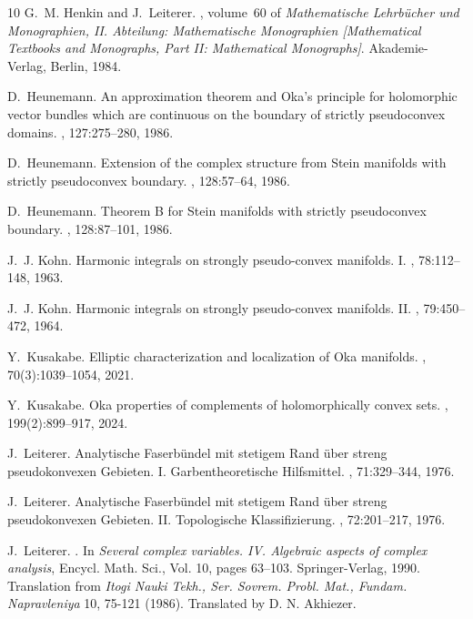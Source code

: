 \documentclass[11pt]{amsart}
\numberwithin{equation}{section}
\theoremstyle{definition}
\begin{document}
\begin{thebibliography}{10}
G.~M. Henkin and J.~Leiterer.
, volume~60 of {\em
  Mathematische Lehrb\"ucher und Monographien, II. Abteilung: Mathematische
  Monographien [Mathematical Textbooks and Monographs, Part II: Mathematical
  Monographs]}.
\newblock Akademie-Verlag, Berlin, 1984.

D.~Heunemann.
\newblock An approximation theorem and {O}ka's principle for holomorphic vector
  bundles which are continuous on the boundary of strictly pseudoconvex
  domains.
, 127:275--280, 1986.

D.~Heunemann.
\newblock Extension of the complex structure from {S}tein manifolds with
  strictly pseudoconvex boundary.
, 128:57--64, 1986.

D.~Heunemann.
\newblock Theorem {B} for {S}tein manifolds with strictly pseudoconvex
  boundary.
, 128:87--101, 1986.

J.~J. Kohn.
\newblock Harmonic integrals on strongly pseudo-convex manifolds. {I}.
, 78:112--148, 1963.

J.~J. Kohn.
\newblock Harmonic integrals on strongly pseudo-convex manifolds. {II}.
, 79:450--472, 1964.

Y.~Kusakabe.
\newblock Elliptic characterization and localization of {O}ka manifolds.
, 70(3):1039--1054, 2021.

Y.~Kusakabe.
\newblock Oka properties of complements of holomorphically convex sets.
, 199(2):899--917, 2024.

J.~Leiterer.
\newblock Analytische {F}aserb\"undel mit stetigem {R}and {\"u}ber streng
  pseudokonvexen {G}ebieten. {I}. {G}arbentheoretische {H}ilfsmittel.
, 71:329--344, 1976.

J.~Leiterer.
\newblock Analytische {F}aserb\"undel mit stetigem {R}and \"uber streng
  pseudokonvexen {G}ebieten. {II}. {T}opologische {K}lassifizierung.
, 72:201--217, 1976.

J.~{Leiterer}.
.
\newblock In {\em Several complex variables. IV. Algebraic aspects of complex
  analysis}, Encycl. Math. Sci., Vol. 10, pages 63--103. Springer-Verlag, 1990.
\newblock Translation from {\em Itogi Nauki Tekh., Ser. Sovrem. Probl. Mat.,
  Fundam. Napravleniya} 10, 75-121 (1986). Translated by D. N. Akhiezer.


\end{thebibliography}
\end{document}
